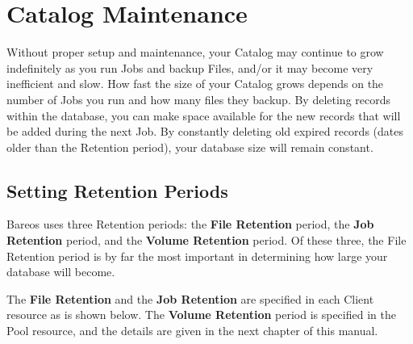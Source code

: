 
\chapter{Catalog Maintenance}
\label{CatMaintenanceChapter}

Without proper setup and maintenance, your Catalog may continue to grow
indefinitely as you run Jobs and backup Files, and/or it may become
very inefficient and slow. How fast the size of your
Catalog grows depends on the number of Jobs you run and how many files they
backup. By deleting records within the database, you can make space available
for the new records that will be added during the next Job. By constantly
deleting old expired records (dates older than the Retention period), your
database size will remain constant.


\section{Setting Retention Periods}
\label{Retention}

Bareos uses three Retention periods: the {\bf File Retention} period,
the {\bf Job Retention} period, and the {\bf Volume Retention} period. Of
these three, the File Retention period is by far the most important in
determining how large your database will become.

The {\bf File Retention} and the {\bf Job Retention} are specified in each
Client resource as is shown below. The {\bf Volume Retention} period is
specified in the Pool resource, and the details are given in the next chapter
of this manual.

